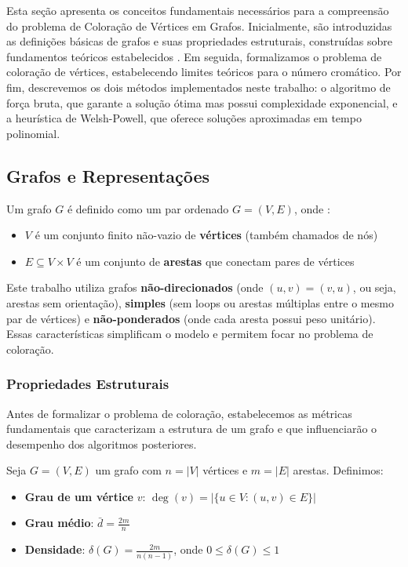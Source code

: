 \documentclass[12pt]{article}
\begin{document}
Esta seção apresenta os conceitos fundamentais necessários para a compreensão do problema de Coloração de Vértices em Grafos. Inicialmente, são introduzidas as definições básicas de grafos e suas propriedades estruturais, construídas sobre fundamentos teóricos estabelecidos \cite{hierholzer1873}. Em seguida, formalizamos o problema de coloração de vértices, estabelecendo limites teóricos para o número cromático. Por fim, descrevemos os dois métodos implementados neste trabalho: o algoritmo de força bruta, que garante a solução ótima mas possui complexidade exponencial, e a heurística de Welsh-Powell, que oferece soluções aproximadas em tempo polinomial.

\subsection{Grafos e Representações}

Um grafo $G$ é definido como um par ordenado $G = (V, E)$, onde \cite{bondy2008graph}:
\begin{itemize}
    \item $V$ é um conjunto finito não-vazio de \textbf{vértices} (também chamados de nós)
    \item $E \subseteq V \times V$ é um conjunto de \textbf{arestas} que conectam pares de vértices
\end{itemize}

Este trabalho utiliza grafos \textbf{não-direcionados} (onde $(u,v) = (v,u)$, ou seja, arestas sem orientação), \textbf{simples} (sem loops ou arestas múltiplas entre o mesmo par de vértices) e \textbf{não-ponderados} (onde cada aresta possui peso unitário). Essas características simplificam o modelo e permitem focar no problema de coloração.

\subsubsection{Propriedades Estruturais}

Antes de formalizar o problema de coloração, estabelecemos as métricas fundamentais que caracterizam a estrutura de um grafo e que influenciarão o desempenho dos algoritmos posteriores.

Seja $G = (V, E)$ um grafo com $n = |V|$ vértices e $m = |E|$ arestas. Definimos:

\begin{itemize}
    \item \textbf{Grau de um vértice} $v$: $\deg(v) = |\{u \in V : (u,v) \in E\}|$
    \item \textbf{Grau médio}: $\bar{d} = \frac{2m}{n}$
    \item \textbf{Densidade}: $\delta(G) = \frac{2m}{n(n-1)}$, onde $0 \leq \delta(G) \leq 1$
\end{itemize}
\end{document}
